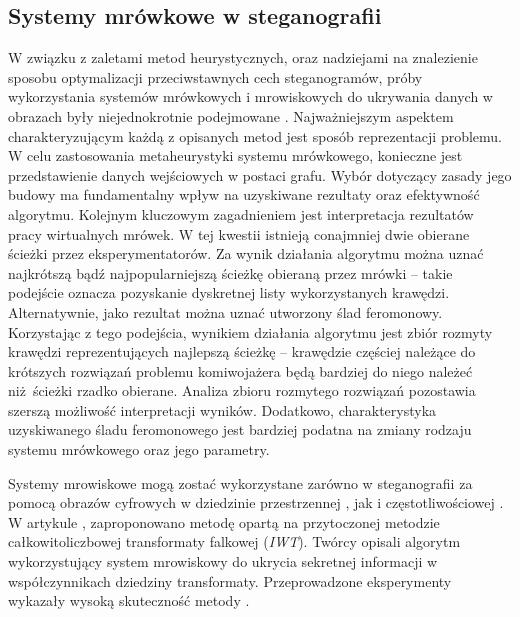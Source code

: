 {{        \subsection{Systemy mrówkowe w steganografii}
        {
            W związku z zaletami metod heurystycznych, oraz nadziejami na znalezienie sposobu optymalizacji
            przeciwstawnych cech steganogramów, próby wykorzystania systemów mrówkowych i mrowiskowych do ukrywania
            danych w obrazach były niejednokrotnie podejmowane \cite{Priya2018HIGHCA, ZghaerACOStegEN, Khan2018AntCO}.
            Najważniejszym aspektem charakteryzującym każdą z opisanych metod jest sposób reprezentacji problemu. W celu
            zastosowania metaheurystyki systemu mrówkowego, konieczne jest przedstawienie danych wejściowych w postaci
            grafu. Wybór dotyczący zasady jego budowy ma fundamentalny wpływ na uzyskiwane rezultaty oraz efektywność
            algorytmu. Kolejnym kluczowym zagadnieniem jest interpretacja rezultatów pracy wirtualnych mrówek. W tej
            kwestii istnieją conajmniej dwie obierane ścieżki przez eksperymentatorów. Za wynik działania algorytmu
            można uznać najkrótszą bądź najpopularniejszą ścieżkę obieraną przez mrówki -- takie podejście oznacza
            pozyskanie dyskretnej listy wykorzystanych krawędzi. Alternatywnie, jako rezultat można uznać utworzony ślad
            feromonowy. Korzystając z tego podejścia, wynikiem działania algorytmu jest zbiór rozmyty krawędzi
            reprezentujących najlepszą ścieżkę -- krawędzie częściej należące do krótszych rozwiązań problemu
            komiwojażera będą bardziej do niego należeć niż ścieżki rzadko obierane. Analiza zbioru rozmytego rozwiązań
            pozostawia szerszą możliwość interpretacji wyników. Dodatkowo, charakterystyka uzyskiwanego śladu
            feromonowego jest bardziej podatna na zmiany rodzaju systemu mrówkowego oraz jego parametry.

            Systemy mrowiskowe mogą zostać wykorzystane zarówno w steganografii za pomocą obrazów cyfrowych w dziedzinie
            przestrzennej  \cite{ZghaerACOStegEN, Khan2018AntCO}, jak i częstotliwościowej \cite{Priya2018HIGHCA}. W
            artykule \cite{Priya2018HIGHCA}, zaproponowano metodę opartą na przytoczonej metodzie całkowitoliczbowej
            transformaty falkowej (\textit{IWT}). Twórcy opisali algorytm wykorzystujący system mrowiskowy do ukrycia
            sekretnej informacji w współczynnikach dziedziny transformaty. Przeprowadzone eksperymenty wykazały wysoką
            skuteczność metody \cite{Priya2018HIGHCA}.

}}}
